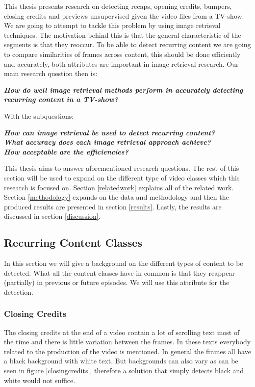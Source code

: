 \documentclass{article}
\begin{document}
This thesis presents research on detecting recaps, opening credits, bumpers, closing credits and previews unsupervised given the video files from a TV-show. We are going to attempt to tackle this problem by using image retrieval techniques. The motivation behind this is that the general characteristic of the segments is that they reoccur. To be able to detect recurring content we are going to compare similarities of frames across content, this should be done efficiently and accurately, both attributes are important in image retrieval research. Our main research question then is:
\newline
\begin{adjustwidth}{0.3in}{0.3in}
\textit{\textbf{How do well image retrieval methods perform in accurately detecting recurring content in a TV-show?\newline}}
\end{adjustwidth}
With the subquestions: \\
\begin{adjustwidth}{0.3in}{0.3in}
	\textit{\textbf{How can image retrieval be used to detect recurring content?\newline}}\\
	\textit{\textbf{What accuracy does each image retrieval approach achieve?\newline}}\\
	\textit{\textbf{How acceptable are the efficiencies?\newline}}
\end{adjustwidth}
This thesis aims to answer aforementioned research questions. The rest of this section will be used to expand on the different type of video classes which this research is focused on. Section \ref{relatedwork} explains all of the related work. Section \ref{methodology} expands on the data and methodology and then the produced results are presented in section \ref{results}. Lastly, the results are discussed in section \ref{discussion}.

\subsection{Recurring Content Classes} \label{section:segmentclasses}
In this section we will give a background on the different types of content to be detected. What all the content classes have in common is that they reappear (partially) in previous or future episodes. We will use this attribute for the detection. 

\subsubsection{Closing Credits}
The closing credits at the end of a video contain a lot of scrolling text most of the time and there is little variation between the frames. In these texts everybody related to the production of the video is mentioned. In general the frames all have a black background with white text. But backgrounds can also vary as can be seen in figure \ref{closingcredits}, therefore a solution that simply detects black and white would not suffice.
\end{document}
